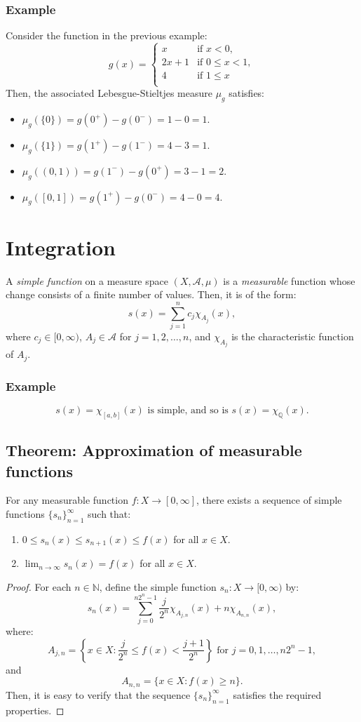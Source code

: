\documentclass[11pt]{article}
\begin{document}
\subsubsection*{Example}
Consider the function in the previous example:
\[g(x) = \begin{cases}
    x & \text{if } x < 0, \\
    2x + 1 & \text{if } 0 \leq x < 1, \\
    4 & \text{if } 1 \leq x \\
\end{cases}\]
Then, the associated Lebesgue-Stieltjes measure \(\mu_g\) satisfies:
\begin{itemize}
    \item \(\mu_g(\{0\}) = g(0^+) - g(0^-) = 1 - 0 = 1\).
    \item \(\mu_g(\{1\}) = g(1^+) - g(1^-) = 4 - 3 = 1\).
    \item \(\mu_g((0, 1)) = g(1^-) - g(0^+) = 3 - 1 = 2\).
    \item \(\mu_g([0, 1]) = g(1^+) - g(0^-) = 4 - 0 = 4\).
\end{itemize}

\section{Integration}
A \textit{simple function} on a measure space \((X, \mathcal{A}, \mu)\) is a \textit{measurable} function whose change consists of a finite number of values. Then, it is of the form:
\[s(x) = \sum_{j=1}^{n} c_j \chi_{A_j}(x),\]
where \(c_j \in [0, \infty)\), \(A_j \in \mathcal{A}\) for \(j = 1, 2, \ldots, n\), and \(\chi_{A_j}\) is the characteristic function of \(A_j\).

\subsubsection*{Example}
\[s(x) = \chi_{[a, b]} (x) \text{ is simple, and so is } s(x) = \chi_{\mathbb{Q}} (x).\]

\subsection{Theorem: Approximation of measurable functions}
For any measurable function \(f: X \to [0, \infty]\), there exists a sequence of simple functions \(\{s_n\}_{n=1}^{\infty}\) such that:
\begin{enumerate}
    \item \(0 \leq s_n(x) \leq s_{n+1}(x) \leq f(x)\) for all \(x \in X\).
    \item \(\lim_{n \to \infty} s_n(x) = f(x)\) for all \(x \in X\).
\end{enumerate}
\begin{proof}
For each \(n \in \mathbb{N}\), define the simple function \(s_n: X \to [0, \infty)\) by:
\[s_n(x) = \sum_{j=0}^{n2^n - 1} \frac{j}{2^n} \chi_{A_{j,n}}(x) + n \chi_{A_{n,n}}(x),\]
where:
\[A_{j,n} = \left\{x \in X : \frac{j}{2^n} \leq f(x) < \frac{j+1}{2^n}\right\} \text{ for } j = 0, 1, \ldots, n2^n - 1,\]
and
\[A_{n,n} = \{x \in X : f(x) \geq n\}.\]
Then, it is easy to verify that the sequence \(\{s_n\}_{n=1}^{\infty}\) satisfies the required properties.  
\end{proof}
\end{document}
